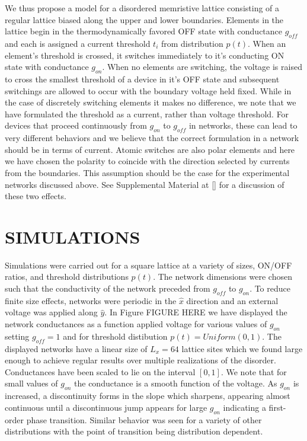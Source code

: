 \documentclass[aps,prl,preprint,groupedaddress]{revtex4-1}
\begin{document}
We thus propose a model for a disordered memristive lattice consisting of a
regular lattice biased along the upper and lower boundaries.  Elements in
the lattice begin in the thermodynamically favored OFF state with conductance
$g_{off}$ and each is assigned a current threshold $t_i$ from distribution
$p(t)$.  When an element's threshold is crossed, it switches immediately to
it's conducting ON state with conductance $g_{on}$.  When no elements are
switching, the voltage is raised to cross the smallest threshold of a device
in it's OFF state and subsequent switchings are allowed to occur with the
boundary voltage held fixed.  While in the case of discretely switching
elements it makes no difference, we note that we have formulated the threshold
as a current, rather than voltage threshold.  For devices that proceed
continuously from $g_{on}$ to $g_{off}$ in networks, these can lead to very
different behaviors and we believe that the correct formulation in a network
should be in terms of current.  Atomic switches are also polar elements and
here we have chosen the polarity to coincide with the direction selected by
currents from the boundaries.  This assumption should be the case for
the experimental networks discussed above.  See Supplemental Material at []
for a discussion of these two effects.

\section{SIMULATIONS}

Simulations were carried out for a square lattice at a variety of sizes,
ON/OFF ratios, and threshold distributions $p(t)$.  The network dimensions
were chosen such that the conductivity of the network preceded from $g_{off}$
to $g_{on}$.  To reduce finite size effects, networks were periodic in the
$\hat{x}$ direction and an external voltage was applied along $\hat{y}$. In
Figure FIGURE HERE we have displayed the network conductances as a function
applied voltage for various values of $g_{on}$ setting $g_{off} = 1$ and for
threshold distibution $p(t) = Uniform(0,1)$.  The displayed networks have
a linear size of $L_x=64$ lattice sites which we found large enough to achieve
regular results over multiple realizations of the disorder. Conductances
have been scaled to lie on the interval $[0,1]$. We note that for small values
of $g_{on}$ the conductance is a smooth function of the voltage.  As $g_{on}$
is increased, a discontinuity forms in the slope which sharpens, appearing
almost continuous until a discontinuous jump appears for large $g_{on}$
indicating a first-order phase transition.  Similar behavior was seen for
a variety of other distributions with the point of transition being
distribution dependent.
\end{document}
